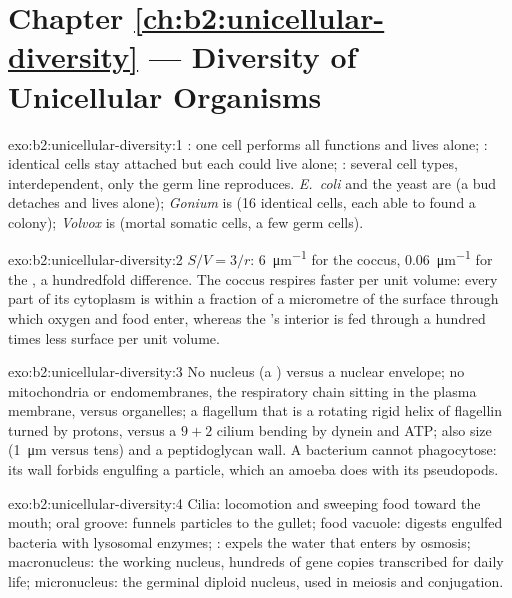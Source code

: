 \section*{Chapter \ref{ch:b2:unicellular-diversity} --- Diversity of Unicellular Organisms}

\begin{solution}{exo:b2:unicellular-diversity:1}
: one cell performs all functions and lives alone;
: identical cells stay attached but each could live alone;
: several cell types, interdependent, only the germ line
reproduces. \emph{E.~coli} and the yeast are  (a bud
detaches and lives alone); \emph{Gonium} is  (16 identical
cells, each able to found a colony); \emph{Volvox} is 
(mortal somatic cells, a few germ cells).
\end{solution}

\begin{solution}{exo:b2:unicellular-diversity:2}
$S/V = 3/r$: \qty{6}{\micro m^{-1}} for the coccus,
\qty{0.06}{\micro m^{-1}} for the , a hundredfold difference.
The coccus respires faster per unit volume: every part of its
cytoplasm is within a fraction of a micrometre of the surface
through which oxygen and food enter, whereas the 's interior
is fed through a hundred times less surface per unit volume.
\end{solution}

\begin{solution}{exo:b2:unicellular-diversity:3}
No nucleus (a ) versus a nuclear envelope; no mitochondria or
endomembranes, the respiratory chain sitting in the plasma membrane,
versus organelles; a flagellum that is a rotating rigid helix of
flagellin turned by protons, versus a $9+2$ cilium bending by
dynein and ATP; also size (\qty{1}{\micro m} versus tens) and a
peptidoglycan wall. A bacterium cannot phagocytose: its wall forbids
engulfing a particle, which an amoeba does with its pseudopods.
\end{solution}

\begin{solution}{exo:b2:unicellular-diversity:4}
Cilia: locomotion and sweeping food toward the mouth; oral groove:
funnels particles to the gullet; food vacuole: digests engulfed
bacteria with lysosomal enzymes; : expels the
water that enters by osmosis; macronucleus: the working nucleus,
hundreds of gene copies transcribed for daily life; micronucleus: the
germinal diploid nucleus, used in meiosis and conjugation.
\end{solution}

